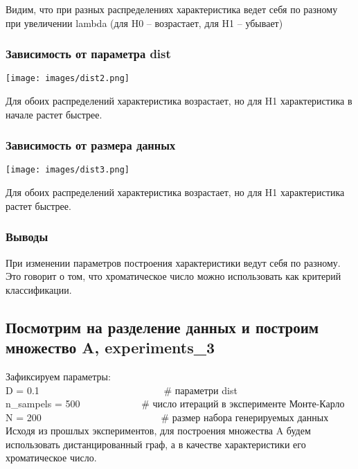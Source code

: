 \documentclass[a4paper,12pt]{article}
\begin{document}
Видим, что при разных распределениях характеристика ведет себя по разному при увеличении lambda (для H0 -- возрастает, для H1 -- убывает) 

\subsubsection*{Зависимость от параметра dist}

\begin{center}
\texttt{[image: images/dist2.png]} \end{center}

Для обоих распределений характеристика возрастает, но для H1 характеристика в начале растет быстрее.

\subsubsection*{Зависимость от размера данных}

\begin{center}
\texttt{[image: images/dist3.png]} \end{center}

Для обоих распределений характеристика возрастает, но для H1 характеристика растет быстрее.


\subsubsection*{Выводы}
При изменении параметров построения характеристики ведут себя по разному. Это говорит о том, что хроматическое число можно использовать как критерий классификации.



\subsection{Посмотрим на разделение данных и построим множество A, experiments\_3}

Зафиксируем параметры:\\
D = 0.1   \ \ \ \     \ \ \  \ \ \ \ \  \ \ \ \ \  \ \ \ \ \ \ \ \  # параметри dist\\
n\_sampels = 500  \ \ \ \ \ \ \ \ \ \ \ \   # число итераций в эксперименте Монте-Карло\\
N = 200  \ \ \ \ \ \ \ \ \ \  \ \ \ \ \ \ \ \ \ \ \ \ \ \          # размер набора генерируемых данных\\

Исходя из прошлых экспериментов, для построения множества A будем использовать дистанцированный граф, а в качестве характеристики его хроматическое число.
\end{document}
